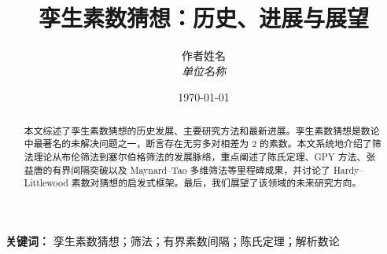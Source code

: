 \documentclass[12pt,a4paper]{article}
\title{孪生素数猜想：历史、进展与展望}
\author{
    作者姓名\\
    \textit{单位名称}
}
\date{\today}
\numberwithin{equation}{section}
\begin{document}
\maketitle

\begin{abstract}
    本文综述了孪生素数猜想的历史发展、主要研究方法和最新进展。孪生素数猜想是数论中最著名的未解决问题之一，断言存在无穷多对相差为 $2$ 的素数。本文系统地介绍了筛法理论从布伦筛法到塞尔伯格筛法的发展脉络，重点阐述了陈氏定理、GPY 方法、张益唐的有界间隔突破以及 Maynard--Tao 多维筛法等里程碑成果，并讨论了 Hardy--Littlewood 素数对猜想的启发式框架。最后，我们展望了该领域的未来研究方向。
\end{abstract}

\textbf{关键词：} 孪生素数猜想；筛法；有界素数间隔；陈氏定理；解析数论

\tableofcontents
\newpage












\appendix

\end{document}
